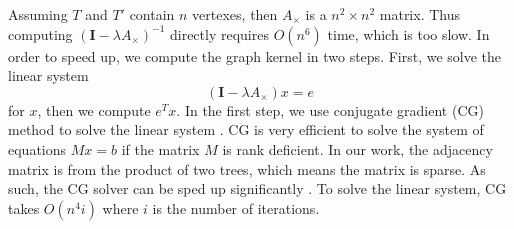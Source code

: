 Assuming $T$ and $T'$ contain $n$ vertexes, then $A_\times$ is a $n^2\times n^2$ matrix. Thus computing $(\boldsymbol{I}-\lambda A_\times)^{-1}$ directly requires $O(n^6)$ time, which is too slow. In order to speed up, we compute the graph kernel in two steps. First, we solve the linear system
\begin{equation}
(\boldsymbol{I}-\lambda A_\times)x = e
\end{equation}
for $x$, then we compute $e^Tx$. In the first step, we use conjugate gradient
(CG) method to solve the linear system \cite{vishwanathan2006fast}.
CG is very efficient to solve the system of equations $Mx=b$ if the matrix $M$
is rank deficient. In our work, the adjacency matrix is from the
product of two trees, which means the matrix is sparse. As such,
the CG solver can be sped up significantly \cite{wright1999numerical}.
To solve the linear system, CG takes
$O(n^4i)$ where $i$ is the number of iterations.

